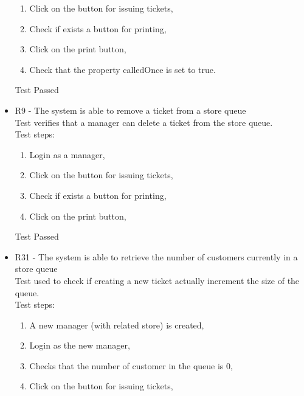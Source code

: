 \begin{itemize}
\begin{enumerate}
        \item Click on the button for issuing tickets,

        \item Check if exists a button for printing,

        \item Click on the print button,

        \item Check that the property calledOnce is set to true.
    \end{enumerate}
    Test Passed \\

    \item R9 - The system is able to remove a ticket from a store queue \\
    Test verifies that a manager can delete a ticket from the store queue. \\
    Test steps: \\
    \begin{enumerate}
        \item Login as a manager,

        \item Click on the button for issuing tickets,

        \item Check if exists a button for printing,

        \item Click on the print button,
    \end{enumerate}
    Test Passed\\

    \item R31 - The system is able to retrieve the number of customers currently in a store queue \\
    Test used to check if creating a new ticket actually increment the size of the queue. \\
    Test steps: \\
    \begin{enumerate}
        \item A new manager (with related store) is created,

        \item Login as the new manager,

        \item Checks that the number of customer in the queue is 0,

        \item Click on the button for issuing tickets,


\end{enumerate}
\end{itemize}
